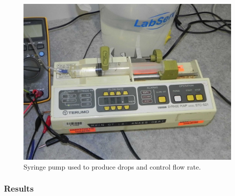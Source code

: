 \begin{figure}
\begin{centering}
\includegraphics[scale=0.15]{content/appendices/chargedWaterDrops/graphics/Photo_dripperExperiment_SyringePump_draft.JPG}
\par\end{centering}

\begin{centering}
\protect\caption{\label{Photo_dripperExperiment_SyringePump}Syringe pump used to produce
drops and control flow rate.}

\par\end{centering}

\end{figure}



\subsubsection*{Results}

